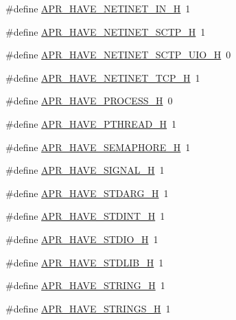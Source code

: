 \begin{DoxyCompactItemize}
\#define \hyperlink{group__apr__platform_gab7a6381062416846012d9a0676e0f35c}{A\+P\+R\+\_\+\+H\+A\+V\+E\+\_\+\+N\+E\+T\+I\+N\+E\+T\+\_\+\+I\+N\+\_\+H}~1
\item 
\#define \hyperlink{group__apr__platform_ga933a3c59c351de4f17cfb8601649fd91}{A\+P\+R\+\_\+\+H\+A\+V\+E\+\_\+\+N\+E\+T\+I\+N\+E\+T\+\_\+\+S\+C\+T\+P\+\_\+H}~1
\item 
\#define \hyperlink{group__apr__platform_ga1bb6606091cafba71be8c37796d36e8a}{A\+P\+R\+\_\+\+H\+A\+V\+E\+\_\+\+N\+E\+T\+I\+N\+E\+T\+\_\+\+S\+C\+T\+P\+\_\+\+U\+I\+O\+\_\+H}~0
\item 
\#define \hyperlink{group__apr__platform_ga2cf9c403892bb0830f24e58b614b8bce}{A\+P\+R\+\_\+\+H\+A\+V\+E\+\_\+\+N\+E\+T\+I\+N\+E\+T\+\_\+\+T\+C\+P\+\_\+H}~1
\item 
\#define \hyperlink{group__apr__platform_ga793aedef0bacf93838d7dc12304e4db1}{A\+P\+R\+\_\+\+H\+A\+V\+E\+\_\+\+P\+R\+O\+C\+E\+S\+S\+\_\+H}~0
\item 
\#define \hyperlink{group__apr__platform_ga4275921ca7165eb1b2a3732a40f1b4ec}{A\+P\+R\+\_\+\+H\+A\+V\+E\+\_\+\+P\+T\+H\+R\+E\+A\+D\+\_\+H}~1
\item 
\#define \hyperlink{group__apr__platform_ga9080d52aaa134fdefc9a03275c7ac4a6}{A\+P\+R\+\_\+\+H\+A\+V\+E\+\_\+\+S\+E\+M\+A\+P\+H\+O\+R\+E\+\_\+H}~1
\item 
\#define \hyperlink{group__apr__platform_ga124a7e90c6c2c74fc54f995e025f694e}{A\+P\+R\+\_\+\+H\+A\+V\+E\+\_\+\+S\+I\+G\+N\+A\+L\+\_\+H}~1
\item 
\#define \hyperlink{group__apr__platform_gaece8f1d70792f3b735fd63cb2233b6a3}{A\+P\+R\+\_\+\+H\+A\+V\+E\+\_\+\+S\+T\+D\+A\+R\+G\+\_\+H}~1
\item 
\#define \hyperlink{group__apr__platform_ga967df26603971704f396b0ec776ed86f}{A\+P\+R\+\_\+\+H\+A\+V\+E\+\_\+\+S\+T\+D\+I\+N\+T\+\_\+H}~1
\item 
\#define \hyperlink{group__apr__platform_ga3b5b55be7a0839f63e0ff1d60a3354ff}{A\+P\+R\+\_\+\+H\+A\+V\+E\+\_\+\+S\+T\+D\+I\+O\+\_\+H}~1
\item 
\#define \hyperlink{group__apr__platform_ga1c8c763f1a54be0d960e0bfa838ee0fb}{A\+P\+R\+\_\+\+H\+A\+V\+E\+\_\+\+S\+T\+D\+L\+I\+B\+\_\+H}~1
\item 
\#define \hyperlink{group__apr__platform_ga0bc16ef0942f44f579dc8027d50f780a}{A\+P\+R\+\_\+\+H\+A\+V\+E\+\_\+\+S\+T\+R\+I\+N\+G\+\_\+H}~1
\item 
\#define \hyperlink{group__apr__platform_ga9c3381ac9d13a54181f0f0db44edb9da}{A\+P\+R\+\_\+\+H\+A\+V\+E\+\_\+\+S\+T\+R\+I\+N\+G\+S\+\_\+H}~1

\end{DoxyCompactItemize}
